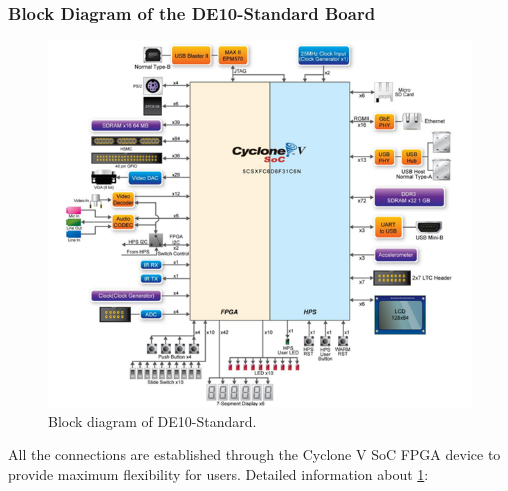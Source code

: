 \subsubsection{Block Diagram of the DE10-Standard Board}

\begin{figure}[H]
	\centering
	\includegraphics[width=0.7\linewidth]{./my-chapters/my-images/theoretical_background/DE_10_block_diagram.png}
	\caption{Block diagram of DE10-Standard.}
	\label{fig: DE10_blockdiagram}
\end{figure}

All the connections are established through the Cyclone V SoC FPGA device to provide maximum flexibility for users. Detailed information about \ref{fig: DE10_blockdiagram}:

